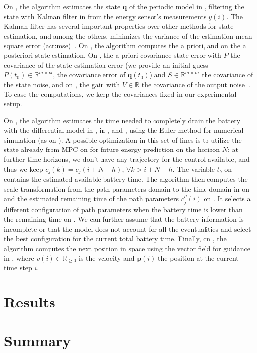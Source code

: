 On , the algorithm estimates the state $\mathbf{q}$ of the periodic model in , filtering the state with Kalman filter in  from the energy sensor's measurements $y(i)$. The Kalman filter has several important properties over other methods for state estimation, and among the others, minimizes the variance of the estimation mean square error (\Gls{acr:mse})~\citep{kalman1960new,simon2006optimal,jwo2007practical}. On , the algorithm computes the a priori, and on  the a posteriori state estimation. On , the a priori covariance state error with $P$ the covariance of the state estimation error (we provide an initial guess $P(t_0)\in\mathbb{R}^{m\times m}$, the covariance error of $\mathbf{q}(t_0)$) and $S\in\mathbb{R}^{m\times m}$ the covariance of the state noise, and on , the gain with $V\in\mathbb{R}$ the covariance of the output noise~\citep{simon2006optimal}. To ease the computations, we keep the covariances fixed in our experimental setup.

On , the algorithm estimates the time needed to completely drain the battery with the differential model in , in , and , using the Euler method for numerical simulation (as on ). A possible optimization in this set of lines is to utilize the state already from MPC on  for future energy prediction on the horizon $N$; at further time horizons, we don't have any trajectory for the control available, and thus we keep $c_j(k)=c_j(i+N-h),\,\forall k>i+N-h$. The variable $t_b$ on  contains the estimated available battery time. The algorithm then computes the scale transformation from the path parameters domain to the time domain in  on  and the estimated remaining time of the path parameters $c_j^\rho(i)$ on . It selects a different configuration of path parameters when the battery time is lower than the remaining time on . We can further assume that the battery information is incomplete or that the model does not account for all the eventualities and select the best configuration for the current total battery time. Finally, on , the algorithm computes the next position in space using the vector field for guidance in , where $v(i)\in\mathbb{R}_{\geq 0}$ is the velocity and $\mathbf{p}(i)$ the position at the current time step $i$. 


\section{\color{red}Results}


\section{\color{red}Summary}


